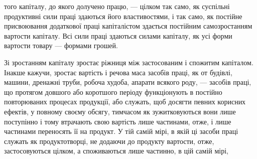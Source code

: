 того капіталу, до якого долучено працю, — цілком так само,
як суспільні продуктивні сили праці здаються його властивостями,
і так само, як постійне присвоювання додаткової праці
капіталістом здається постійним самозростанням вартости капіталу.
Всі сили праці здаються силами капіталу, як усі форми
вартости товару — формами грошей.

Зі зростанням капіталу зростає ріжниця між застосованим
і спожитим капіталом. Інакше кажучи, зростає вартість і речова
маса засобів праці, як от будівлі, машини, дренажні труби, робоча
худоба, апарати всякого роду, — засобів праці, що протягом
довшого або коротшого періоду функціонують в постійно повторюваних
процесах продукції, або служать, щоб досягти певних
корисних ефектів, у повному своєму обсягу, тимчасом як зужитковуються
вони лише поступінно і тому втрачають свою вартість
лише частинами, отже, і лише частинами переносять її на продукт.
У тій самій мірі, в якій ці засоби праці служать як продуктотворці,
не додаючи до продукту вартости, отже, застосовуються
цілком, а споживаються лише частинно, в цій самій мірі,

